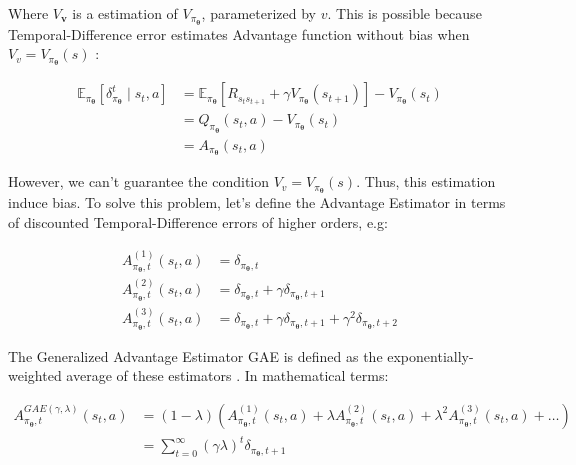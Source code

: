 Where $V_{\boldsymbol{v}}$ is a estimation of $V_{\pi_{\boldsymbol{\theta}}}$, parameterized by $v$. This is possible because Temporal-Difference error estimates Advantage function without bias when $V_{v} = V_{\pi_{\boldsymbol{\theta}}}(s)$ :

\begin{align}
\mathbb{E}_{\pi_{\boldsymbol{\theta}}}[\delta^{t}_{\pi_{\boldsymbol{\theta}}} \mid s_{t},a] 
&= \mathbb{E}_{\pi_{\boldsymbol{\theta}}}[ R_{s_{t}s_{t+1}} + \gamma V_{\pi_{\boldsymbol{\theta}}}(s_{t+1})] - V_{\pi_{\boldsymbol{\theta}}}(s_{t}) \\
&= Q_{\pi_{\boldsymbol{\theta}}}(s_{t},a) - V_{\pi_{\boldsymbol{\theta}}}(s_{t}) \\
&= A_{\pi_{\boldsymbol{\theta}}}(s_{t},a)
\end{align}

However, we can't guarantee the condition $V_{v} = V_{\pi_{\boldsymbol{\theta}}}(s)$. Thus, this estimation induce bias. To solve this problem, let's define the Advantage Estimator in terms of discounted Temporal-Difference errors of higher orders, e.g:

\begin{align}
A^{(1)}_{\pi_{\boldsymbol{\theta}}, t}(s_{t},a) &= \delta_{\pi_{\boldsymbol{\theta}}, t} \\
A^{(2)}_{\pi_{\boldsymbol{\theta}}, t}(s_{t},a) &= \delta_{\pi_{\boldsymbol{\theta}}, t} + \gamma \delta_{\pi_{\boldsymbol{\theta}}, t + 1} \\
A^{(3)}_{\pi_{\boldsymbol{\theta}}, t}(s_{t},a) &= \delta_{\pi_{\boldsymbol{\theta}}, t} + \gamma \delta_{\pi_{\boldsymbol{\theta}}, t + 1} + \gamma^{2}  \delta_{\pi_{\boldsymbol{\theta}}, t + 2}
\end{align}

The Generalized Advantage Estimator GAE is defined as the exponentially-weighted average of these estimators \cite{DBLP:journals/corr/SchulmanMLJA15}. In mathematical terms:

\begin{align}
A^{GAE(\gamma, \lambda)}_{\pi_{\boldsymbol{\theta}}, t}(s_{t},a) &= (1 - \lambda)(A^{(1)}_{\pi_{\boldsymbol{\theta}}, t}(s_{t},a) + \lambda A^{(2)}_{\pi_{\boldsymbol{\theta}}, t}(s_{t},a) + \lambda^{2} A^{(3)}_{\pi_{\boldsymbol{\theta}}, t}(s_{t},a) + \dots)\label{eq:gae1} \\
&= \sum_{t = 0}^{\infty} (\gamma \lambda)^{t} \delta_{\pi_{\boldsymbol{\theta}}, t+1} \label{eq:gae2}
\end{align}

